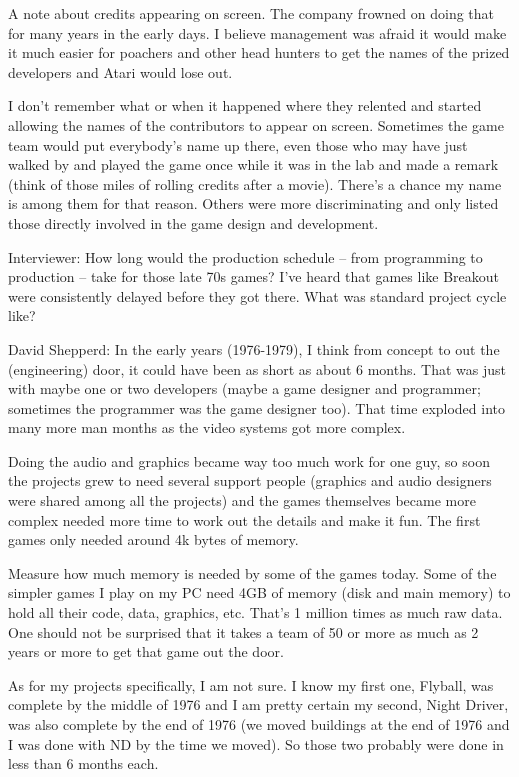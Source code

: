 A note about credits appearing on screen. The company frowned on doing that for many years in the early days. I believe management was afraid it would make it much easier for poachers and other head hunters to get the names of the prized developers and Atari would lose out. 

I don't remember what or when it happened where they relented and started allowing the names of the contributors to appear on screen. Sometimes the game team would put everybody's name up there, even those who may have just walked by and played the game once while it was in the lab and made a remark (think of those miles of rolling credits after a movie). There's a chance my name is among them for that reason. Others were more discriminating and only listed those directly involved in the game design and development.

\textcolor{interviewer}{Interviewer:} How long would the production schedule – from programming to production – take for those late 70s games? I’ve heard that games like Breakout were consistently delayed before they got there. What was standard project cycle like?

\textcolor{interviewee}{David Shepperd:} In the early years (1976-1979), I think from concept to out the (engineering) door, it could have been as short as about 6 months. That was just with maybe one or two developers (maybe a game designer and programmer; sometimes the programmer was the game designer too). That time exploded into many more man months as the video systems got more complex. 

Doing the audio and graphics became way too much work for one guy, so soon the projects grew to need several support people (graphics and audio designers were shared among all the projects) and the games themselves became more complex needed more time to work out the details and make it fun. The first games only needed around 4k bytes of memory. 

Measure how much memory is needed by some of the games today. Some of the simpler games I play on my PC need 4GB of memory (disk and main memory) to hold all their code, data, graphics, etc. That's 1 million times as much raw data. One should not be surprised that it takes a team of 50 or more as much as 2 years or more to get that game out the door.

As for my projects specifically, I am not sure. I know my first one, Flyball, was complete by the middle of 1976 and I am pretty certain my second, Night Driver, was also complete by the end of 1976 (we moved buildings at the end of 1976 and I was done with ND by the time we moved). So those two probably were done in less than 6 months each. 

